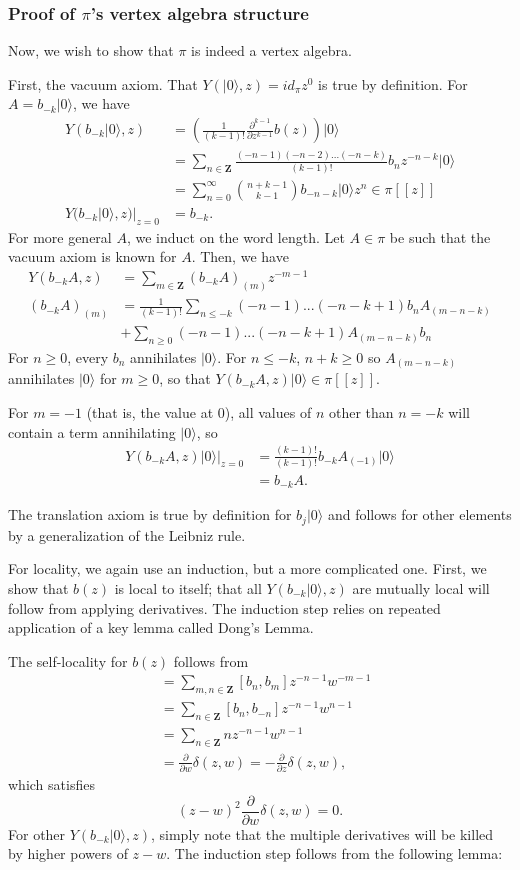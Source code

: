 \documentclass{article}
\newcommand{\ZZ}{\mathbold{Z}}
\newcommand{\vac}{|0\rangle}
\begin{document}
\subsubsection{Proof of $\pi$'s vertex algebra structure}
Now, we wish to show that $\pi$ is indeed a vertex algebra.

First, the vacuum axiom.  That $Y(\vac,z)=id_\pi z^0$ is true by definition.  For $A=b_{-k}\vac$, we have
\begin{align}
  Y(b_{-k}\vac,z)&=\left(\frac{1}{(k-1)!} \frac{\partial^{k-1}}{\partial z^{k-1}} b(z) \right) \vac\\
  &=\sum_{n \in \ZZ}\frac{(-n-1)(-n-2)...(-n-k)}{(k-1)!} b_n z^{-n-k} \vac\\
  &=\sum_{n=0}^\infty \binom{n+k-1}{k-1}b_{-n-k}\vac z^n \in \pi[[z]]\\
  Y(b_{-k}\vac,z)|_{z=0}&=b_{-k}.
\end{align}
For more general $A$, we induct on the word length.  Let $A \in \pi$ be such that the vacuum axiom is known for $A$.  Then, we have
\begin{align}
  Y(b_{-k}A,z)&= \sum_{m \in \ZZ}(b_{-k}A)_{(m)}z^{-m-1}\\
  (b_{-k}A)_{(m)}&=\frac{1}{(k-1)!}\sum_{n \le -k}(-n-1)...(-n-k+1)b_nA_{(m-n-k)}\\
  &+\sum_{n \ge 0}(-n-1)...(-n-k+1)A_{(m-n-k)}b_n
\end{align}
For $n \ge 0$, every $b_n$ annihilates $\vac$.  For $n \le -k$, $n+k \ge 0$ so $A_{(m-n-k)}$ annihilates $\vac$ for $m \ge 0$, so that $Y(b_{-k}A,z)\vac \in \pi[[z]]$.

For $m=-1$ (that is, the value at $0$), all values of $n$ other than $n=-k$ will contain a term annihilating $\vac$, so
\begin{align}
  Y(b_{-k}A,z)\vac|_{z=0}&=\frac{(k-1)!}{(k-1)!}b_{-k}A_{(-1)}\vac\\
  &=b_{-k}A.
\end{align}

The translation axiom is true by definition for $b_j\vac$ and follows for other elements by a generalization of the Leibniz rule.

For locality, we again use an induction, but a more complicated one.  First, we show that $b(z)$ is local to itself; that all $Y(b_{-k}\vac,z)$ are mutually local will follow from applying derivatives.  The induction step relies on repeated application of a key lemma called Dong's Lemma.

The self-locality for $b(z)$ follows from
\begin{align}
  [b(z),b(w)]&=\sum_{m,n \in \ZZ}[b_n,b_m]z^{-n-1}w^{-m-1}\\
  &=\sum_{n \in \ZZ}[b_n,b_{-n}]z^{-n-1}w^{n-1}\\
  &=\sum_{n \in \ZZ}nz^{-n-1}w^{n-1}\\
  &=\frac{\partial}{\partial w}\delta(z,w)=-\frac{\partial}{\partial z}\delta(z,w),
\end{align}
which satisfies
\[(z-w)^2 \frac{\partial}{\partial w}\delta(z,w)=0.\]  
For other $Y(b_{-k}\vac,z)$, simply note that the multiple derivatives will be killed by higher powers of $z-w$.  The induction step follows from the following lemma:
\end{document}
